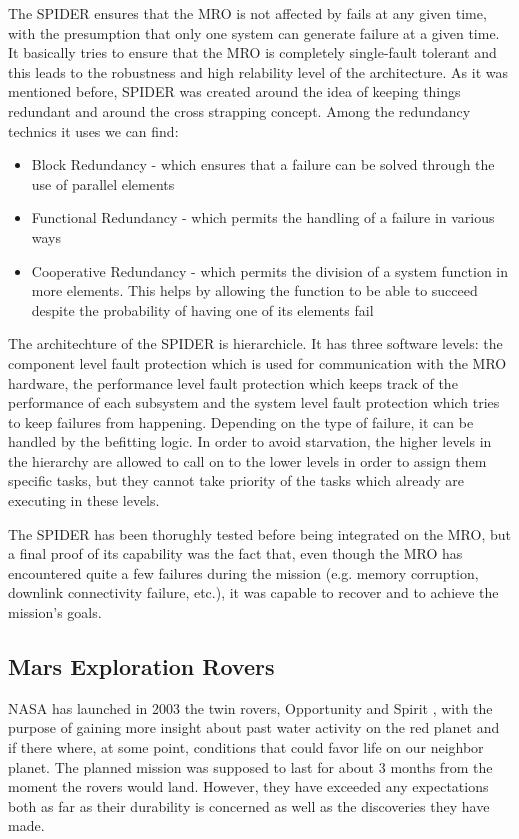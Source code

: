 The SPIDER ensures that the MRO is not affected by fails at any given time, with
the presumption that only one system can generate failure at a given time. It
basically tries to ensure that the MRO is completely single-fault tolerant and
this leads to the robustness and high relability level of the architecture. As
it was mentioned before, SPIDER was created around the idea of keeping things
redundant and around the cross strapping concept. Among the redundancy technics
it uses we can find:
\begin{itemize}
\item Block Redundancy - which ensures that a failure can be solved through the
use of parallel elements
\item Functional Redundancy - which permits the handling of a failure in various
ways
\item Cooperative Redundancy - which permits the division of a system function
in more elements. This helps by allowing the function to be able to succeed despite
the probability of having one of its elements fail
\end{itemize}

The architechture of the SPIDER is hierarchicle. It has three software levels:
the component level fault protection which is used for communication with the
MRO hardware, the performance level fault protection which keeps track of the
performance of each subsystem and the system level fault protection which tries
to keep failures from happening. Depending on the type of failure, it can be
handled by the befitting logic. In order to avoid starvation, the higher levels
in the hierarchy are allowed to call on to the lower levels in order to assign
them specific tasks, but they cannot take priority of the tasks which
already are executing in these levels.

The SPIDER has been thorughly tested before being integrated on the MRO, but a
final proof of its capability was the fact that, even though the MRO has
encountered quite a few failures during the mission (e.g. memory corruption,
downlink connectivity failure, etc.), it was capable to recover and to achieve
the mission's goals.

\subsection{Mars Exploration Rovers}

NASA has launched in 2003 the twin rovers, Opportunity and Spirit
\cite{mer-nasa}, with the purpose of gaining more insight about past water
activity on the red planet and if there where, at some point, conditions that
could favor life on our neighbor planet. The planned mission was supposed to
last for about 3 months from the moment the rovers would land. However, they
have exceeded any expectations both as far as their durability is concerned as
well as the discoveries they have made.


